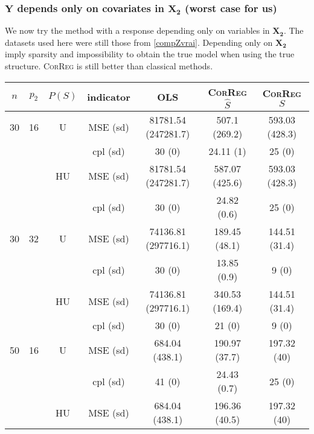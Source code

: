 \documentclass[11pt,a4paper]{article}
\begin{document}
\clearpage
	\subsubsection{$\boldsymbol{Y}$ depends only on covariates in $\boldsymbol{X_2}$ (worst case for us)}	 \label{tableMSEsimgauche}
We now try the method with a response depending only on variables in $\boldsymbol{X_2}$. The datasets used here were still those from \ref{compZvrai}.
Depending only on $\boldsymbol{X_2}$ imply sparsity and impossibility to obtain the true model when using the true structure. \textsc{CorReg} is still better than classical methods. 

\begin{table}[h!]
\centering
\begin{tabular}{|c|c|c|c|c|c|c|}
\hline 
$n$ & $p_2$&$P(S)$ &indicator &OLS  &    \textsc{CorReg} $\hat S$& \textsc{CorReg} $S$\\ 
\hline %
30 & 16 & U&MSE (sd) & 81781.54 (247281.7) & 507.1 (269.2) & 593.03 (428.3) \\
& & & cpl (sd) & 30 (0) & 24.11 (1) & 25 (0) \\
 &  &HU &MSE (sd) & 81781.54 (247281.7) & 587.07 (425.6) & 593.03 (428.3) \\
& & & cpl (sd) & 30 (0) & 24.82 (0.6) & 25 (0) \\
\hline %
30 & 32 & U & MSE (sd) & 74136.81 (297716.1) & 189.45 (48.1) & 144.51 (31.4) \\
& & & cpl (sd) & 30 (0) & 13.85 (0.9) & 9 (0) \\
 &  & HU & MSE (sd) & 74136.81 (297716.1) & 340.53 (169.4) & 144.51 (31.4) \\
& & & cpl (sd) & 30 (0) & 21 (0) & 9 (0) \\
\hline
\hline %
50 & 16 & U&	MSE (sd) & 684.04 (438.1) & 190.97 (37.7) & 197.32 (40) \\
& & & cpl (sd) & 41 (0) & 24.43 (0.7) & 25 (0) \\
 &  &HU &MSE (sd) & 684.04 (438.1) & 196.36 (40.5) & 197.32 (40) \\

\end{tabular}
\end{table}
\end{document}
